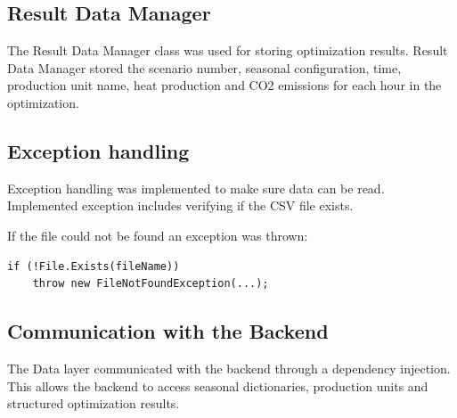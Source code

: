 \subsection{Result Data Manager}

The Result Data Manager class was used for storing optimization results. 
Result Data Manager stored the scenario number, seasonal configuration, time, production unit name, heat production and CO2 emissions for each hour in the optimization.



\subsection{Exception handling}

Exception handling was implemented to make sure data can be read.
Implemented exception includes verifying if the CSV file exists.


\noindent \newline If the file could not be found an exception was thrown:

\begin{verbatim}
if (!File.Exists(fileName))
    throw new FileNotFoundException(...);
\end{verbatim}


\subsection{Communication with the Backend}

The Data layer communicated with the backend through a dependency injection. This allows the backend to access seasonal dictionaries, production units and structured optimization results.




